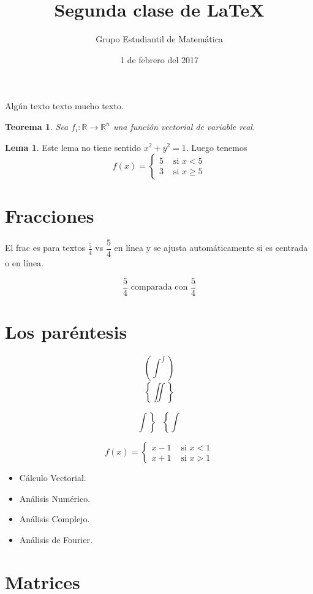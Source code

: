\documentclass[a4paper,12pt]{article}
\title{Segunda clase de \LaTeX}
\author{Grupo Estudiantil de Matemática}
\date{1 de febrero del 2017}
\theoremstyle{theorem}
\newtheorem{teo}{Teorema}[section]
\theoremstyle{definition}
\newtheorem{lema}{Lema}[section]
\begin{document}
\maketitle

Algún texto texto mucho texto.

\begin{teo}
	Sea \( f_i \colon \mathbb{R} \to \mathbb{R}^n \) una función vectorial de variable real.
\end{teo}

\begin{lema} 
	Este lema no tiene sentido \( x^2+y^2=1 \). Luego tenemos 
	\[ f(x)=\begin{cases} 5 & \mbox{ si } x<5 \\ 3 & \mbox{ si } x\ge5  \end{cases} \]
\end{lema}

\section{Fracciones}
	
El frac es para textos \( \frac{5}{4} \) vs \( \dfrac{5}{4} \) en línea y se ajusta automáticamente si es centrada o en línea.
	
\[ \frac{5}{4} \mbox{ comparada con } \dfrac{5}{4}  \]

\section{Los paréntesis}
	
\[   \left(  \int^\int  \right)  \]
\[ \left\lbrace \iint \right\rbrace \] 
	  
\[ \left. \int \right\rbrace ~~~ \left\lbrace \int \right. \]
	 
	 
\[  f(x)=
	\begin{cases}
	x-1 & \mbox{ si } x<1 \\
	x+1 & \mbox{ si } x>1 
	\end{cases}
\]
	       
	       
\begin{itemize}
	\item Cálculo Vectorial. %
	\item Análisis Numérico.
	\item Análisis Complejo.
	\item Análisis de Fourier.
\end{itemize}
	       
\section{Matrices}
\end{document}

